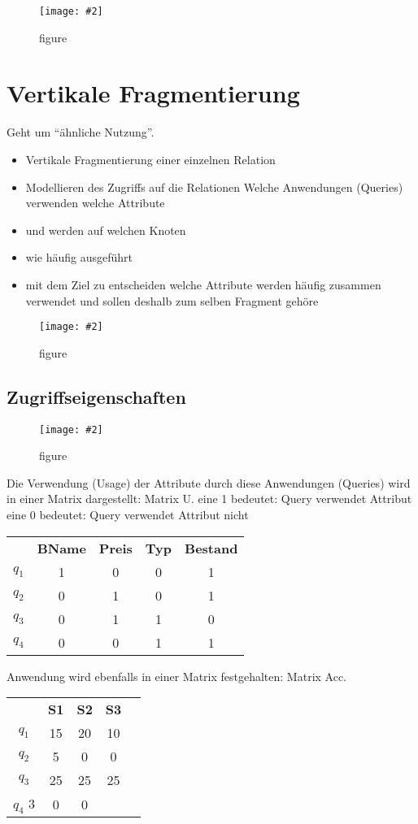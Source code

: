 \documentclass[a4paper,10pt,titlepage=false]{scrreprt}
\newcommand{\pic}[2][figure]{\begin{figure}[h]
 \centering
 \texttt{[image: \#2]}
 \caption{#1}
\end{figure}
}
\begin{document}
\pic{dhfbsp.png}


\chapter{Vertikale Fragmentierung}

Geht um ``ähnliche Nutzung''.
\begin{itemize}

\item Vertikale Fragmentierung einer einzelnen Relation
\item Modellieren des Zugriffs auf die Relationen
\subitem Welche Anwendungen (Queries)
\subitem verwenden welche Attribute
\item und werden auf welchen Knoten
\item wie häufig ausgeführt
\item mit dem Ziel zu entscheiden
\subitem welche Attribute werden häufig zusammen verwendet
\subitem und sollen deshalb zum selben Fragment gehöre
\end{itemize}

\pic{dbvf.png}
\section{Zugriffseigenschaften}
\pic{dbze.png}
Die Verwendung (Usage) der Attribute durch diese
Anwendungen (Queries) wird in einer Matrix dargestellt:
Matrix U.
eine 1 bedeutet: Query verwendet Attribut
eine 0 bedeutet: Query verwendet Attribut nicht
\begin{tabular}{c c c c c}
 &\textbf{BName} & \textbf{Preis}  & \textbf{Typ} & \textbf{Bestand}\\
$q_1$ & 1 & 0 & 0 & 1 \\
$q_2$ & 0 & 1 &0 & 1 \\
$q_3$ & 0 & 1 & 1 & 0 \\
$q_4$ & 0 & 0 & 1 & 1 \\
\end{tabular}

Anwendung wird ebenfalls in einer Matrix festgehalten:
Matrix Acc.

\begin{tabular}{c c c c c}
 &\textbf{S1} & \textbf{S2}  & \textbf{S3}\\
$q_1$ & 15 & 20 & 10 \\
$q_2$ & 5 & 0 & 0 \\
$q_3$ & 25 & 25 & 25 \\
$q_4$ 3 & 0 & 0 \\
\end{tabular}
\end{document}
